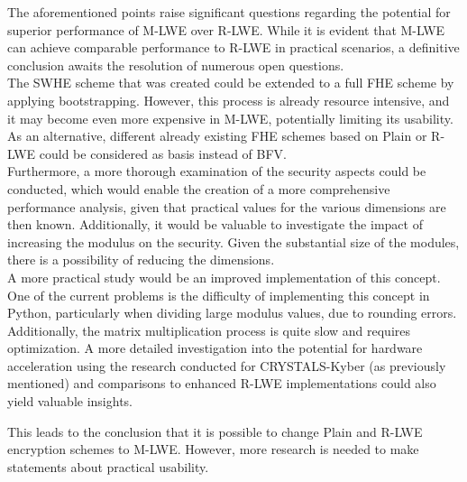 The aforementioned points raise significant questions regarding the potential for superior performance of M-LWE over R-LWE. While it is evident that M-LWE can achieve comparable performance to R-LWE in practical scenarios, a definitive conclusion awaits the resolution of numerous open questions.\\
The SWHE scheme that was created could be extended to a full FHE scheme by applying bootstrapping. However, this process is already resource intensive, and it may become even more expensive in M-LWE, potentially limiting its usability. As an alternative, different already existing FHE schemes based on Plain or R-LWE could be considered as basis instead of BFV. \\
Furthermore, a more thorough examination of the security aspects could be conducted, which would enable the creation of a more comprehensive performance analysis, given that practical values for the various dimensions are then known. Additionally, it would be valuable to investigate the impact of increasing the modulus on the security. Given the substantial size of the modules, there is a possibility of reducing the dimensions.\\
A more practical study would be an improved implementation of this concept. One of the current problems is the difficulty of implementing this concept in Python, particularly when dividing large modulus values, due to rounding errors. Additionally, the matrix multiplication process is quite slow and requires optimization. A more detailed investigation into the potential for hardware acceleration using the research conducted for CRYSTALS-Kyber (as previously mentioned) and comparisons to enhanced R-LWE implementations could also yield valuable insights.

This leads to the conclusion that it is possible to change Plain and R-LWE encryption schemes to M-LWE. However, more research is needed to make statements about practical usability.
